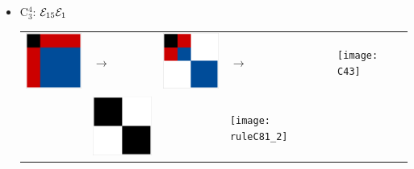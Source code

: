 \begin{itemize}
\begin{itemize}
\pagebreak
\item C$_3^4$: $\mathcal{E}_{15}\mathcal{E}_{1}$\newline
\begin{tabular}{m{2cm} m{2cm} m{2cm} m{2cm} m{2cm}}
\includegraphics[width=2.2cm]{img-JA/id}  
& \hspace{0.8cm}$\longrightarrow$ 
& \includegraphics[width=2.2cm]{img-JA/8comp} 
& \hspace{0.8cm}$\longrightarrow$ 
& \texttt{[image: C43]}\\ 
 & \includegraphics[width=2.2cm]{img-JA/16To8} &  
 & \texttt{[image: ruleC81\_2]} &\\ 
\end{tabular} 


\end{itemize}
\end{itemize}
